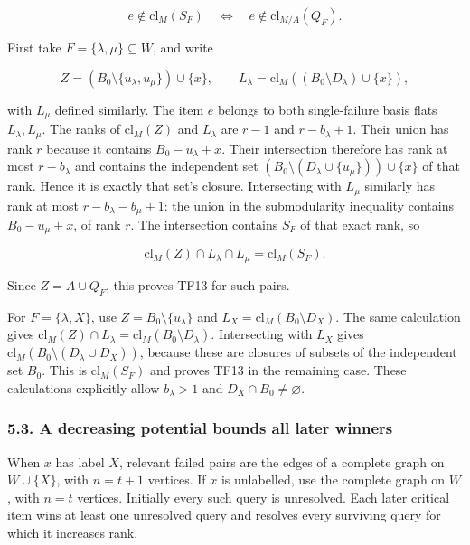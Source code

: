 \[
e\notin\mathrm{cl}_M(S_F)
\quad\Longleftrightarrow\quad
e\notin\mathrm{cl}_{M/A}(Q_F).
\tag{TF13}
\]

First take \(F=\{\lambda,\mu\}\subseteq W\), and write

\[
Z=(B_0\setminus\{u_\lambda,u_\mu\})\cup\{x\},
\qquad
L_\lambda=\mathrm{cl}_M((B_0\setminus D_\lambda)\cup\{x\}),
\]

with \(L_\mu\) defined similarly. The item \(e\) belongs to both single-failure basis flats \(L_\lambda,L_\mu\). The ranks of \(\mathrm{cl}_M(Z)\) and \(L_\lambda\) are \(r-1\) and \(r-b_\lambda+1\). Their union has rank \(r\) because it contains \(B_0-u_\lambda+x\). Their intersection therefore has rank at most \(r-b_\lambda\) and contains the independent set \((B_0\setminus(D_\lambda\cup\{u_\mu\}))\cup\{x\}\) of that rank. Hence it is exactly that set's closure. Intersecting with \(L_\mu\) similarly has rank at most \(r-b_\lambda-b_\mu+1\): the union in the submodularity inequality contains \(B_0-u_\mu+x\), of rank \(r\). The intersection contains \(S_F\) of that exact rank, so

\[
\mathrm{cl}_M(Z)\cap L_\lambda\cap L_\mu
=\mathrm{cl}_M(S_F).
\]

Since \(Z=A\cup Q_F\), this proves TF13 for such pairs.

For \(F=\{\lambda,X\}\), use \(Z=B_0\setminus\{u_\lambda\}\) and \(L_X=\mathrm{cl}_M(B_0\setminus D_X)\). The same calculation gives \(\mathrm{cl}_M(Z)\cap L_\lambda =\mathrm{cl}_M(B_0\setminus D_\lambda)\). Intersecting with \(L_X\) gives \(\mathrm{cl}_M(B_0\setminus(D_\lambda\cup D_X))\), because these are closures of subsets of the independent set \(B_0\). This is \(\mathrm{cl}_M(S_F)\) and proves TF13 in the remaining case. These calculations explicitly allow \(b_\lambda>1\) and \(D_X\cap B_0\ne\varnothing\).

\hypertarget{af-0a3ce40617-a-decreasing-potential-bounds-all-later-winners}{%
\subsubsection{5.3. A decreasing potential bounds all later winners}\label{af-0a3ce40617-a-decreasing-potential-bounds-all-later-winners}}

When \(x\) has label \(X\), relevant failed pairs are the edges of a complete graph on \(W\cup\{X\}\), with \(n=t+1\) vertices. If \(x\) is unlabelled, use the complete graph on \(W\), with \(n=t\) vertices. Initially every such query is unresolved. Each later critical item wins at least one unresolved query and resolves every surviving query for which it increases rank.


